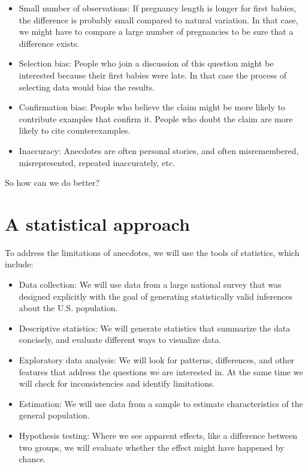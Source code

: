 \documentclass[]{book}
\providecommand{\tightlist}{%
  \setlength{\itemsep}{0pt}\setlength{\parskip}{0pt}}
\begin{document}
\begin{itemize}
\tightlist
\item
  Small number of observations: If
  pregnancy length is longer for first babies, the difference is
  probably small compared to natural variation. In that case, we might
  have to compare a large number of pregnancies to be sure that a
  difference exists.
\item
  Selection bias: People who join a
  discussion of this question might be interested because their first
  babies were late. In that case the process of selecting data would
  bias the results.\\
\item
  Confirmation bias: People who believe
  the claim might be more likely to contribute examples that confirm
  it. People who doubt the claim are more likely to cite
  counterexamples.\\
\item
  Inaccuracy: Anecdotes are often
  personal stories, and often misremembered, misrepresented, repeated
  inaccurately, etc.
\end{itemize}

So how can we do better?

\hypertarget{a-statistical-approach}{%
\section{A statistical approach}\label{a-statistical-approach}}

To address the limitations of anecdotes,
we will use the tools of statistics, which include:

\begin{itemize}
\item
  Data collection: We will use data
  from a large national survey that was designed explicitly with the
  goal of generating statistically valid inferences about the U.S.
  population.
\item
  Descriptive statistics: We will
  generate statistics that summarize the data concisely, and evaluate
  different ways to visualize data.
\item
  Exploratory data analysis: We will
  look for patterns, differences, and other features that address the
  questions we are interested in. At the same time we will check for
  inconsistencies and identify limitations.
\item
  Estimation: We will use data from a
  sample to estimate characteristics of the general population.
\item
  Hypothesis testing: Where we see
  apparent effects, like a difference between two groups, we will
  evaluate whether the effect might have happened by chance.
\end{itemize}
\end{document}
